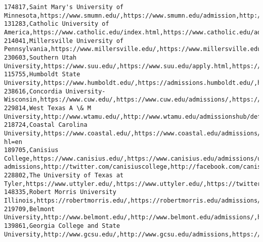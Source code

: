 \documentclass[11pt]{article}
\begin{document}
\begin{Verbatim}[commandchars=\\\{\}]
174817,Saint Mary's University of Minnesota,https://www.smumn.edu/,https://www.smumn.edu/admission,http://www.twitter.com/smumn,http://www.facebook.com/smumn,http://www.instagram.com/smumn
131283,Catholic University of America,https://www.catholic.edu/index.html,https://www.catholic.edu/admission/index.html,http://twitter.com/CatholicUniv,http://www.facebook.com/CatholicUniversity,http://instagram.com/catholicuniversity
214041,Millersville University of Pennsylvania,https://www.millersville.edu/,https://www.millersville.edu/admissions/,https://twitter.com/millersvilleu/,https://www.facebook.com/millersvilleu/,https://www.instagram.com/millersvilleu/
230603,Southern Utah University,https://www.suu.edu/,https://www.suu.edu/apply.html,https://www.twitter.com/suutbirds,https://www.facebook.com/SUUTbirds,https://www.instagram.com/suutbirds
115755,Humboldt State University,https://www.humboldt.edu/,https://admissions.humboldt.edu/,https://twitter.com/humboldtstate/,https://www.facebook.com/humboldtstate,https://www.instagram.com/livefromhsu/
238616,Concordia University-Wisconsin,https://www.cuw.edu/,https://www.cuw.edu/admissions/,https://twitter.com/CUWisconsin,https://www.facebook.com/CUWisconsin,https://www.instagram.com/cuwisconsin/
229814,West Texas A \& M University,http://www.wtamu.edu/,http://www.wtamu.edu/admissionshub/default.aspx,http://www.twitter.com/wtamu,http://www.facebook.com/wtamu,http://www.instagram.com/wtamu
218724,Coastal Carolina University,https://www.coastal.edu/,https://www.coastal.edu/admissions/,https://twitter.com/CCUchanticleers,https://www.facebook.com/CoastalCarolinaUniversity,https://instagram.com/ccuchanticleers/?hl=en
189705,Canisius College,https://www.canisius.edu/,https://www.canisius.edu/admissions/undergraduate-admissions,http://twitter.com/canisiuscollege,http://facebook.com/canisiuscollege,http://instagram.com/canisius\_college/
228802,The University of Texas at Tyler,https://www.uttyler.edu/,https://www.uttyler.edu/,https://twitter.com/uttyler/,https://www.facebook.com/uttyler/,https://www.instagram.com/uttyler/
148335,Robert Morris University Illinois,https://robertmorris.edu/,https://robertmorris.edu/admissions/,https://twitter.com/RobertMorrisU,https://www.facebook.com/RMUIllinois,http://www.instagram.com/robertmorrisu
219709,Belmont University,http://www.belmont.edu/,http://www.belmont.edu/admissions/,https://twitter.com/BelmontUniv,https://www.facebook.com/events/2268925126457280/,https://instagram.com/belmontu/
139861,Georgia College and State University,http://www.gcsu.edu/,http://www.gcsu.edu/admissions,https://twitter.com/georgiacollege,https://www.facebook.com/GaCollege,https://instagram.com/georgiacollege

\end{Verbatim}
\end{document}
